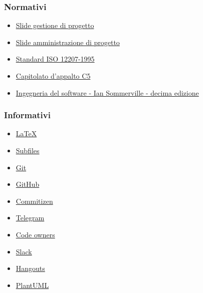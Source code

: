 \documentclass[../norme-di-progetto.tex]{subfiles}
\begin{document}
\subsubsection{Normativi}%
\label{subs:riferimenti/normativi}

\begin{itemize}
  \item \href{https://www.math.unipd.it/~tullio/IS-1/2019/Dispense/L06.pdf}{Slide gestione di progetto}
  \item \href{https://www.math.unipd.it/~tullio/IS-1/2019/Dispense/FC01.pdf}{Slide amministrazione di progetto}
  \item \href{https://www.math.unipd.it/~tullio/IS-1/2009/Approfondimenti/ISO_12207-1995.pdf}{Standard ISO 12207-1995}
  \item \href{https://www.math.unipd.it/~tullio/IS-1/2019/Progetto/C5.pdf}{Capitolato d'appalto C5}
  \item \href{https://www.pearson.it/opera/pearson/0-6424-ingegneria_del_software}{Ingegneria del software - Ian Sommerville - decima edizione}
\end{itemize}

\subsubsection{Informativi}%
\label{subs:riferimenti/informativi}

\begin{itemize}
  \item \href{https://www.latex-project.org/help/documentation/}{\LaTeX}
  \item \href{https://www.overleaf.com/learn/latex/Multi-file_LaTeX_projects#The_subfiles_package}{Subfiles}
  \item \href{https://git-scm.com/}{Git}
  \item \href{https://github.com/}{GitHub}
  \item \href{https://commitizen.github.io/cz-cli/}{Commitizen}
  \item \href{https://desktop.telegram.org/}{Telegram}
  \item \href{https://help.github.com/en/github/creating-cloning-and-archiving-repositories/about-code-owners}{Code owners}
  \item \href{https://slack.com/intl/en-it/}{Slack}
  \item \href{https://hangouts.google.com}{Hangouts}
  \item \href{https://plantuml.com/}{PlantUML}
\end{itemize}
\end{document}
